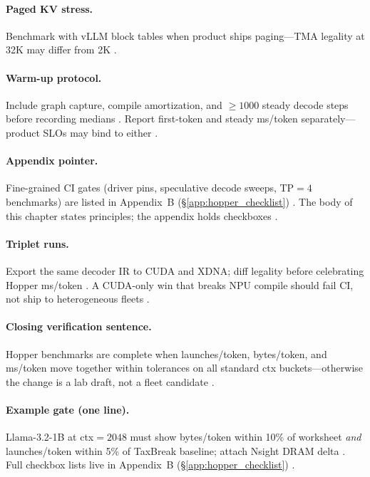 \paragraph{Paged KV stress.}
Benchmark with vLLM block tables when product ships paging---TMA legality at 32K may differ from 2K \citep{kwon2023vllm,dao2023flashdecoding}.

\paragraph{Warm-up protocol.}
Include graph capture, compile amortization, and ${\ge}1000$ steady decode steps before recording medians \citep{nvidia2024cudagraphs,taxbreak2026,patel2025llminference}.
Report first-token and steady ms/token separately---product SLOs may bind to either \citep{kwon2023vllm,memoryfloor2026}.

\paragraph{Appendix pointer.}
Fine-grained CI gates (driver pins, speculative decode sweeps, TP${=}4$ benchmarks) are listed in Appendix~B (\S\ref{app:hopper_checklist}) \citep{yirage2026,patel2025llminference,liu2024deepseekv3}.
The body of this chapter states principles; the appendix holds checkboxes \citep{taxbreak2026,memoryfloor2026}.

\paragraph{Triplet runs.}
Export the same decoder IR to CUDA and XDNA; diff legality before celebrating Hopper ms/token \citep{yirage2026,amd2024xdna,amd2024aie,chen2020compilerbasedhardw,patel2025llminference}.
A CUDA-only win that breaks NPU compile should fail CI, not ship to heterogeneous fleets \citep{amd2024xdna,yirage2026}.

\paragraph{Closing verification sentence.}
Hopper benchmarks are complete when launches/token, bytes/token, and ms/token move together within tolerances on all standard ctx buckets---otherwise the change is a lab draft, not a fleet candidate \citep{taxbreak2026,memoryfloor2026,patel2025llminference,yirage2026}.

\paragraph{Example gate (one line).}
Llama-3.2-1B at ctx${=}2048$ must show bytes/token within 10\% of worksheet \emph{and} launches/token within 5\% of TaxBreak baseline; attach Nsight DRAM delta \citep{taxbreak2026,memoryfloor2026,patel2025llminference,yirage2026}.
Full checkbox lists live in Appendix~B (\S\ref{app:hopper_checklist}) \citep{yirage2026,chen2020compilerbasedhardw}.

